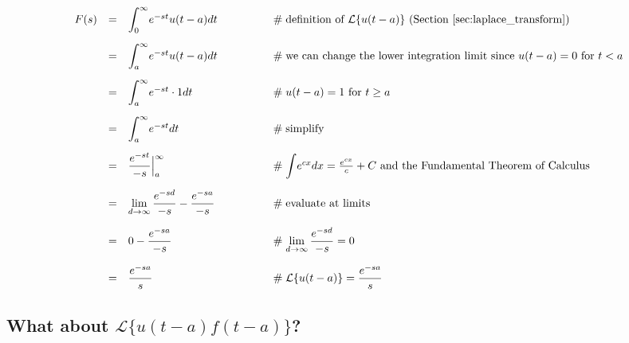 \documentclass{article}
\theoremstyle{definition}
\begin{document}
\bigskip
\begin{equation*}
\begin{array}{lllll}
F(s)                                                                                                                          
&=& \mathlarger{\int}^\infty_0 e^{-st} u(t-a) dt                        &\qquad\qquad \mathrel{\#} \text{definition of $\mathcal{L}\{u(t-a)\}$ (Section \ref{sec:laplace_transform})}                                 \\
[15pt]
&=& \mathlarger{\int}^\infty_a e^{-st} u(t-a) dt                        &\qquad\qquad \mathrel{\#} \text{we can change the lower integration limit since $u(t-a) = 0$ for $t < a$}                                    \\
[15pt]
&=& \mathlarger{\int}^\infty_a e^{-st} \cdot 1 dt                      &\qquad\qquad \mathrel{\#} \text{$u(t-a) = 1$ for $t \geq a$}                                                                                                           \\
[15pt]
&=& \mathlarger{\int}^\infty_a e^{-st} dt                                  &\qquad\qquad \mathrel{\#} \text{simplify}                                                                                                                                        \\
[15pt]
&=& \mathlarger{\frac{e^{-st}}{-s}} \Big |^\infty_a                    &\qquad\qquad \mathrel{\#} \mathlarger{\int} e^{cx} dx = \frac{e^{cx}}{c} + C \text{ and the Fundamental Theorem of Calculus}  \\
[15pt]
&=& \lim\limits_{d \to \infty} \mathlarger{\frac{e^{-sd}}{-s}} - \mathlarger{\frac{e^{-sa}}{-s}}   &\qquad\qquad \mathrel{\#} \text{evaluate at limits}                                                                          \\
[15pt]
&=& 0 -  \mathlarger{\frac{e^{-sa}}{-s}}                                   &\qquad\qquad \mathrel{\#} \lim\limits_{d \to \infty} \mathlarger{\frac{e^{-sd}}{-s}} = 0                                                                      \\
[15pt]
&=& \mathlarger{\frac{e^{-sa}}{s}}                                          &\qquad\qquad \mathrel{\#} \mathcal{L}\{u(t-a)\} = \mathlarger{\frac{e^{-sa}}{s}}
\end{array}
\end{equation*}


\subsection{What about $\mathcal{L}\{u(t-a) f(t-a)\}$?}
\label{sec:lt_uf}
\end{document}
